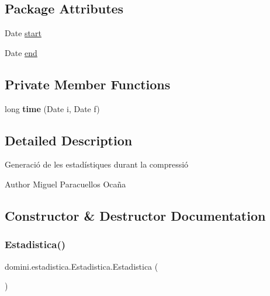 \subsection*{Package Attributes}
\begin{DoxyCompactItemize}
\item 
Date \hyperlink{classdomini_1_1estadistica_1_1Estadistica_aee0ae604272563ceab4e61392cbd343e}{start}
\item 
Date \hyperlink{classdomini_1_1estadistica_1_1Estadistica_ae99e664f0569e308009ec7ca32864006}{end}
\end{DoxyCompactItemize}
\subsection*{Private Member Functions}
\begin{DoxyCompactItemize}
\item 
\mbox{\label{classdomini_1_1estadistica_1_1Estadistica_a7587e21e3f7f177afe0dd36483c8fe5d}} 
long {\bfseries time} (Date i, Date f)
\end{DoxyCompactItemize}


\subsection{Detailed Description}
Generació de les estadístiques durant la compressió 

\begin{DoxyAuthor}{Author}
Miguel Paracuellos Ocaña 
\end{DoxyAuthor}


\subsection{Constructor \& Destructor Documentation}
\mbox{\label{classdomini_1_1estadistica_1_1Estadistica_a16c37d85709413fd65f8dee111faed49}} 
\subsubsection{\texorpdfstring{Estadistica()}{Estadistica()}}
{\footnotesize\ttfamily domini.\+estadistica.\+Estadistica.\+Estadistica (\begin{DoxyParamCaption}{ }\end{DoxyParamCaption})\hspace{0.3cm}{\ttfamily [inline]}}



